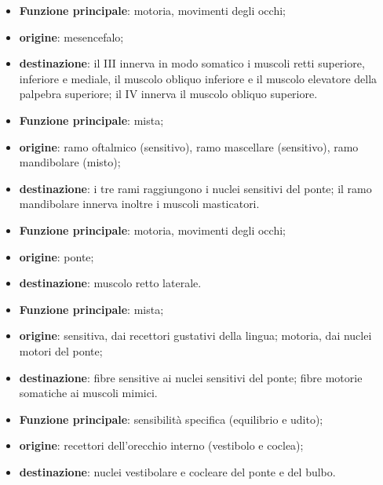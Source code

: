\begin{itemize}
  \item \textbf{Funzione principale}: motoria, movimenti degli occhi;
  \item \textbf{origine}: mesencefalo;
  \item \textbf{destinazione}: il III innerva in modo somatico i muscoli
    retti superiore, inferiore e mediale, il muscolo obliquo inferiore e il
    muscolo elevatore della palpebra superiore; il IV innerva il muscolo
    obliquo superiore.
\end{itemize}

\begin{itemize}
  \item \textbf{Funzione principale}: mista;
  \item \textbf{origine}: ramo oftalmico (sensitivo), ramo mascellare
    (sensitivo), ramo mandibolare (misto);
  \item \textbf{destinazione}: i tre rami raggiungono i nuclei sensitivi del
    ponte; il ramo mandibolare innerva inoltre i muscoli masticatori.
\end{itemize}

\begin{itemize}
  \item \textbf{Funzione principale}: motoria, movimenti degli occhi;
  \item \textbf{origine}: ponte;
  \item \textbf{destinazione}: muscolo retto laterale.
\end{itemize}

\begin{itemize}
  \item \textbf{Funzione principale}: mista;
  \item \textbf{origine}: sensitiva, dai recettori gustativi della lingua;
    motoria, dai nuclei motori del ponte;
  \item \textbf{destinazione}: fibre sensitive ai nuclei sensitivi del
    ponte; fibre motorie somatiche ai muscoli mimici.
\end{itemize}

\begin{itemize}
  \item \textbf{Funzione principale}: sensibilità specifica (equilibrio e
    udito);
  \item \textbf{origine}: recettori dell'orecchio interno (vestibolo e
    coclea);
  \item \textbf{destinazione}: nuclei vestibolare e cocleare del ponte e del
    bulbo.
\end{itemize}

